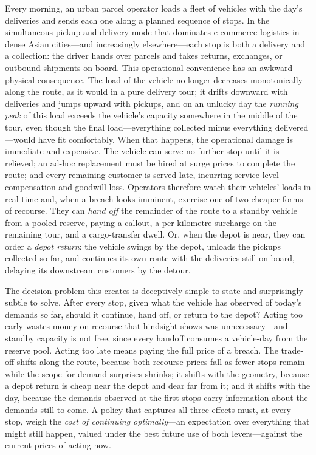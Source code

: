 \documentclass[preprint,authoryear,12pt]{elsarticle}
\theoremstyle{definition}
\theoremstyle{remark}
\begin{document}
Every morning, an urban parcel operator loads a fleet of vehicles with
the day's deliveries and sends each one along a planned sequence of
stops. In the simultaneous pickup-and-delivery mode that dominates
e-commerce logistics in dense Asian cities---and increasingly
elsewhere---each stop is both a delivery and a collection: the driver
hands over parcels and takes returns, exchanges, or outbound shipments
on board. This operational convenience has an awkward physical
consequence. The load of the vehicle no longer decreases monotonically
along the route, as it would in a pure delivery tour; it drifts
downward with deliveries and jumps upward with pickups, and on an
unlucky day the \emph{running peak} of this load exceeds the vehicle's
capacity somewhere in the middle of the tour, even though the final
load---everything collected minus everything delivered---would have fit
comfortably. When that happens, the operational damage is immediate and
expensive. The vehicle can serve no further stop until it is relieved;
an ad-hoc replacement must be hired at surge prices to complete the
route; and every remaining customer is served late, incurring
service-level compensation and goodwill loss. Operators therefore watch
their vehicles' loads in real time and, when a breach looks imminent,
exercise one of two cheaper forms of recourse. They can \emph{hand off}
the remainder of the route to a standby vehicle from a pooled reserve,
paying a callout, a per-kilometre surcharge on the remaining tour, and a
cargo-transfer dwell. Or, when the depot is near, they can order a
\emph{depot return}: the vehicle swings by the depot, unloads the
pickups collected so far, and continues its own route with the
deliveries still on board, delaying its downstream customers by the
detour.

The decision problem this creates is deceptively simple to state and
surprisingly subtle to solve. After every stop, given what the vehicle
has observed of today's demands so far, should it continue, hand off, or
return to the depot? Acting too early wastes money on recourse that
hindsight shows was unnecessary---and standby capacity is not free, since
every handoff consumes a vehicle-day from the reserve pool. Acting too
late means paying the full price of a breach. The trade-off shifts along
the route, because both recourse prices fall as fewer stops remain while
the scope for demand surprises shrinks; it shifts with the geometry,
because a depot return is cheap near the depot and dear far from it; and it shifts with the day, because the demands observed at
the first stops carry information about the demands still to come. A
policy that captures all three effects must, at every stop, weigh the
\emph{cost of continuing optimally}---an expectation over everything that
might still happen, valued under the best future use of both
levers---against the current prices of acting now.
\end{document}
